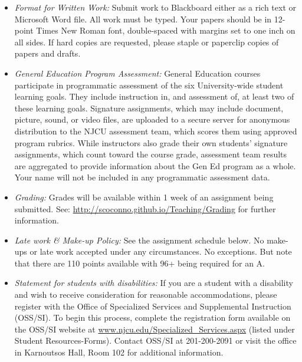 \documentclass[article,oneside]{memoir}
\begin{document}
\begin{itemize}
\item \textit{Format for Written Work:} Submit work to Blackboard either as a rich text or Microsoft Word file. All work must be typed. Your papers should be in 12-point Times New Roman font, double-spaced with margins set to one inch on all sides. If hard copies are requested, please staple or paperclip copies of papers and drafts.


\item \textit{General Education Program Assessment:} General Education courses participate in programmatic assessment of the six University-wide student learning goals. They include instruction in, and assessment of, at least two of these learning goals. Signature assignments, which may include document, picture, sound, or video files, are uploaded to a secure server for anonymous distribution to the NJCU assessment team, which scores them using approved program rubrics. While instructors also grade their own students’ signature assignments, which count toward the course grade, assessment team results are aggregated to provide information about the Gen Ed program as a whole. Your name will not be included in any programmatic assessment data.

\item \textit{Grading:} Grades will be available within 1 week of an assignment being submitted. See: \href{http://scoconno.github.io/Teaching/Grading}{http://scoconno.github.io/Teaching/Grading} for further information.


\item \textit{Late work \& Make-up Policy:} See the assignment schedule below. No make-ups or late work accepted under any circumstances. No exceptions. But note that there are 110 points available with 96+ being required for an A.


\item \textit{Statement for students with disabilities:} If you are a student with a disability and wish to receive consideration for reasonable accommodations, please register with the Office of Specialized Services and Supplemental Instruction (OSS/SI). To begin this process, complete the registration form available on the OSS/SI website at
\href{http://www.njcu.edu/Specialized_Services.aspx}{www.njcu.edu/Specialized\_Services.aspx}
(listed under Student Resources-Forms). Contact OSS/SI at 201-200-2091
or visit the office in Karnoutsos Hall, Room 102 for additional
information.

\end{itemize}
\end{document}
